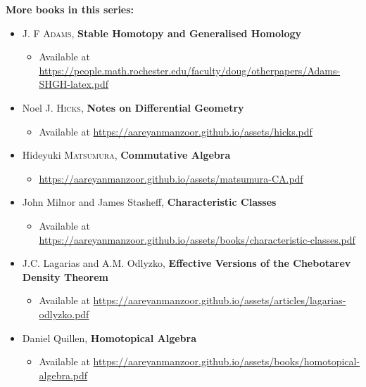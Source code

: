 \documentclass[../main]{subfiles}
\begin{document}
\noindent\textbf{More books in this series:}
\begin{itemize}
    \item J. F \textsc{Adams}, \textbf{Stable Homotopy and Generalised Homology}
        \begin{itemize}
            \item Available at \url{https://people.math.rochester.edu/faculty/doug/otherpapers/Adams-SHGH-latex.pdf}
        \end{itemize}
    \item Noel J. \textsc{Hicks}, \textbf{Notes on Differential Geometry}
        \begin{itemize}
            \item Available at \url{https://aareyanmanzoor.github.io/assets/hicks.pdf}
        \end{itemize}
    \item Hideyuki \textsc{Matsumura}, \textbf{Commutative Algebra}
        \begin{itemize}
            \item \url{https://aareyanmanzoor.github.io/assets/matsumura-CA.pdf}
        \end{itemize}
    \item John Milnor and James Stasheff, \textbf{Characteristic Classes}
    \begin{itemize}
        \item Available at \url{https://aareyanmanzoor.github.io/assets/books/characteristic-classes.pdf}
    \end{itemize}
    \item J.C. Lagarias and A.M. Odlyzko, \textbf{Effective Versions of the Chebotarev Density Theorem}
    \begin{itemize}
        \item Available at \url{https://aareyanmanzoor.github.io/assets/articles/lagarias-odlyzko.pdf}
    \end{itemize}
    \item Daniel Quillen, \textbf{Homotopical Algebra}
    \begin{itemize}
        \item Available at \url{https://aareyanmanzoor.github.io/assets/books/homotopical-algebra.pdf}
    \end{itemize}
\end{itemize}

\vfill
\end{document}
